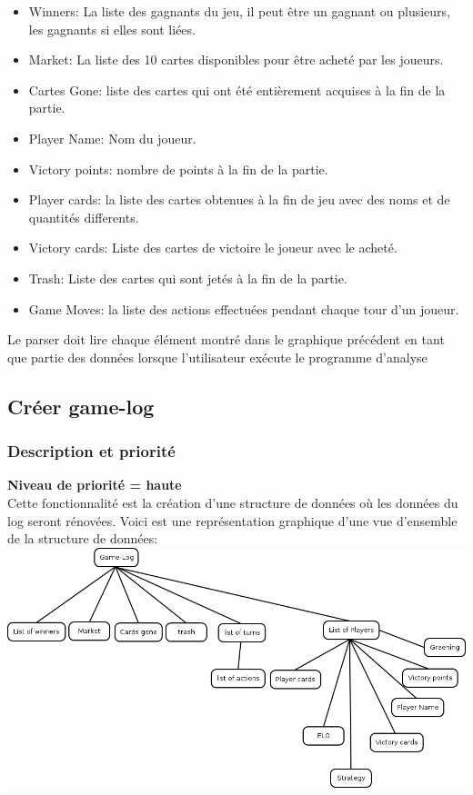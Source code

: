 \documentclass{scrreprt}
\begin{document}
\begin{itemize}
\item Winners: La liste des gagnants du jeu, il peut être un gagnant ou plusieurs, les gagnants si elles sont liées.
\item Market: La liste des 10 cartes disponibles pour être acheté par les joueurs.
\item Cartes Gone: liste des cartes qui ont été entièrement acquises à la fin de la partie.
\item Player Name: Nom du joueur.
\item Victory points: nombre de points à la fin de la partie.
\item Player cards: la liste des cartes obtenues à la fin de jeu avec des noms et de quantités differents.
\item Victory cards: Liste des cartes de victoire le joueur avec le acheté.
\item Trash: Liste des cartes qui sont jetés à la fin de la partie.
\item Game Moves: la liste des actions effectuées pendant chaque tour d'un joueur.
\end{itemize}
Le parser doit lire chaque élément montré dans le graphique précédent en tant que partie des données lorsque l'utilisateur exécute le programme d'analyse\\

\subsection{Créer game-log}
\subsubsection{Description et priorité}
\textbf{Niveau de priorité = haute}\\
Cette fonctionnalité est la création d'une structure de données où les données du log seront rénovées.
Voici est une représentation graphique d'une vue d'ensemble de la structure de données:\\
\includegraphics[scale=0.5,keepaspectratio]{game-log}
\end{document}

